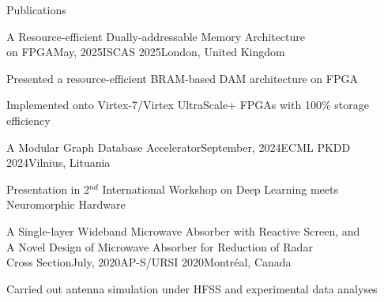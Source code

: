\documentclass{resume} %
\begin{document}
\begin{rSection}{Publications}

	
	\begin{rSubsection}{A Resource-efficient Dually-addressable Memory Architecture\\on FPGA}{May, 2025}{ISCAS 2025}{London, United Kingdom}
		\item Presented a resource-efficient BRAM-based DAM architecture on FPGA
		\item Implemented onto Virtex-7/Virtex UltraScale+ FPGAs with 100\% storage efficiency
	\end{rSubsection}
	
	\begin{rSubsection}{A Modular Graph Database Accelerator}{September, 2024}{ECML PKDD 2024}{Vilnius, Lituania}
		\item Presentation in 2$^{nd}$ International Workshop on Deep Learning meets Neuromorphic Hardware
	\end{rSubsection}
	
	\begin{rSubsection}{A Single-layer Wideband Microwave Absorber with Reactive Screen, and\\A Novel Design of Microwave Absorber for Reduction of Radar\\Cross Section}{July, 2020}{AP-S/URSI 2020}{Montréal, Canada}
		\item Carried out antenna simulation under HFSS and experimental data analyses
	\end{rSubsection}

\end{rSection}

\newpage
\end{document}
